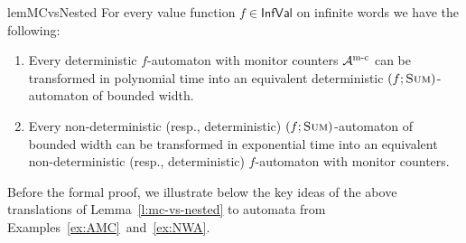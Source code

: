 \documentclass{lmcs}
\newcommand{\fsum}{\textsc{Sum}}
\newcommand{\InfVal}{\mathsf{InfVal}}
\begin{document}
\begin{restatable}{lem}{MCvsNested}\label{l:mc-vs-nested}
For every value function $f \in \InfVal$ on infinite words we have the following:
\begin{enumerate}
\item Every deterministic $f$-automaton with monitor counters $\mathcal{A}^{\textrm{m-c}}$ can be transformed in polynomial time
into an equivalent deterministic $(f;\fsum)$-automaton of bounded width.
\item Every non-deterministic (resp., deterministic) $(f;\fsum)$-automaton of bounded width can be transformed in exponential time
into an equivalent non-deterministic (resp., deterministic) $f$-automaton with monitor counters.
\end{enumerate}
\end{restatable}

\noindent
Before the formal proof, we illustrate below the key ideas of the above translations of
Lemma~\ref{l:mc-vs-nested} to automata from Examples~\ref{ex:AMC}~and~\ref{ex:NWA}.
\end{document}
